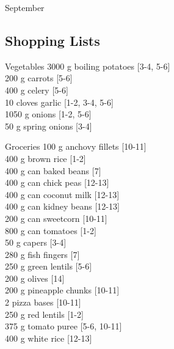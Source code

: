 \begin{menu}{September}
    \subsection*{Shopping Lists}
      \begin{shoppinglist}{Vegetables}
      3000 g boiling potatoes {\scriptsize[3-4, 5-6]}\\
      200 g carrots {\scriptsize[5-6]}\\
      400 g celery {\scriptsize[5-6]}\\
      10 cloves garlic {\scriptsize[1-2, 3-4, 5-6]}\\
      1050 g onions {\scriptsize[1-2, 5-6]}\\
      50 g spring onions {\scriptsize[3-4]}\\
      \end{shoppinglist}%
      \begin{shoppinglist}{Groceries}
      100 g anchovy fillets {\scriptsize[10-11]}\\
      400 g brown rice {\scriptsize[1-2]}\\
      400 g can baked beans {\scriptsize[7]}\\
      400 g can chick peas {\scriptsize[12-13]}\\
      400 g can coconut milk {\scriptsize[12-13]}\\
      400 g can kidney beans {\scriptsize[12-13]}\\
      200 g can sweetcorn {\scriptsize[10-11]}\\
      800 g can tomatoes {\scriptsize[1-2]}\\
      50 g capers {\scriptsize[3-4]}\\
      280 g fish fingers {\scriptsize[7]}\\
      250 g green lentils {\scriptsize[5-6]}\\
      200 g olives {\scriptsize[14]}\\
      200 g pineapple chunks {\scriptsize[10-11]}\\
      2  pizza bases {\scriptsize[10-11]}\\
      250 g red lentils {\scriptsize[1-2]}\\
      375 g tomato puree {\scriptsize[5-6, 10-11]}\\
      400 g white rice {\scriptsize[12-13]}\\
      \end{shoppinglist}%
      \par\vfil %

\end{menu}

